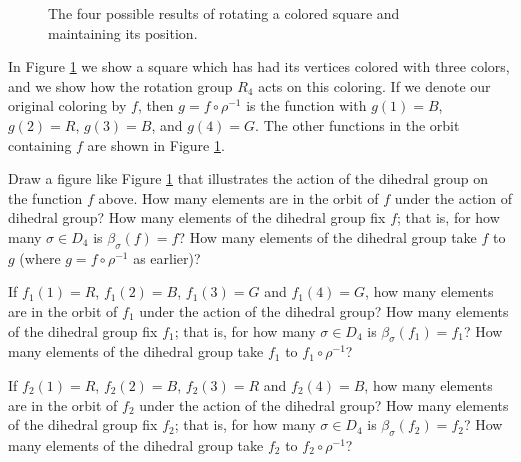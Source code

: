 \begin{figure}[htb]\caption{The four
possible results of rotating a colored square
and maintaining its position.}\label{RotationsOfColoredSquare}\smallskip
\begin{center}\mbox{}
\end{center}  
\end{figure}
 In
Figure \ref{RotationsOfColoredSquare} we show a square which has had its
vertices colored with three colors, and we show how the rotation group
$R_4$ acts on this coloring.   
If we denote our original coloring by $f$,
then $g=f\circ\rho^{-1}$ is the function with $g(1)=B$, $g(2) = R$,
$g(3)=B$, and $g(4)=G$. The other functions in the orbit containing $f$
are shown in Figure \ref{RotationsOfColoredSquare}.

\bp
\iteme Draw a figure like Figure \ref{RotationsOfColoredSquare} that
illustrates the action of the dihedral group on the function $f$ above. 
How many elements are in the orbit of $f$ under the action of dihedral
group? How many elements of the dihedral group fix $f$; that is, for how
many $\sigma \in D_4$ is $\beta_{\sigma}(f) =
f$?\label{dihedralorbits1}  
 How many elements of the dihedral group take $f$ to $g$ (where $g=f\circ
\rho^{-1}$ as earlier)?

\itemm If $f_1(1)=R$, $f_1(2) = B$, $f_1(3) = G$ and $f_1(4) = G$, how many
elements are in the orbit of $f_1$ under the action of the dihedral group?
How many elements of the dihedral group fix $f_1$; that is, for how
many $\sigma \in D_4$ is $\beta_{\sigma}(f_1) =
f_1$?\label{dihedralorbits2}  How many elements of the dihedral group
take $f_1$ to $f_1\circ\rho^{-1}$?

\itemm If $f_2(1)=R$, $f_2(2) = B$, $f_2(3) = R$ and $f_2(4) = B$, how many
elements are in the orbit of $f_2$ under the action of the dihedral group?
How many elements of the dihedral group fix $f_2$; that is, for how
many $\sigma \in D_4$ is $\beta_{\sigma}(f_2) =
f_2$?\label{dihedralorbits3}   How many elements of the dihedral group
take $f_2$ to $f_2\circ\rho^{-1}$?


